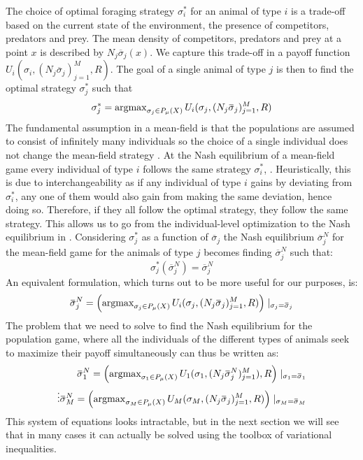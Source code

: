 The choice of optimal foraging strategy $\sigma_i^*$ for an animal of type $i$ is a trade-off based on the current state of the environment, the presence of competitors, predators and prey. The mean density of competitors, predators and prey at a point $x$ is described by $N_j \overbar{\sigma}_j(x)$. We capture this trade-off in a payoff function $U_i(\sigma_i, (N_j \overbar{\sigma}_j)_{j=1}^M, R)$. The goal of a single animal of type $j$ is then to find the optimal strategy $\sigma_j^*$ such that
\begin{equation}
  \label{eq:ind_opt}
  \sigma^*_j = \argmax_{\sigma_j \in P_{\mu}(X)} U_i(\sigma_j, (N_j \overbar{\sigma}_j)_{j=1}^M, R)
\end{equation}
The fundamental assumption in a mean-field is that the populations are assumed to consist of infinitely many individuals so the choice of a single individual does not change the mean-field strategy \citep{aumann1964markets}. At the Nash equilibrium of a mean-field game every individual of type $i$ follows the same strategy $\sigma_i^*$, \citep{lasry2007mean}. Heuristically, this is due to interchangeability as if any individual of type $i$ gains by deviating from $\sigma_i^*$, any one of them would also gain from making the same deviation, hence doing so. Therefore, if they all follow the optimal strategy, they follow the same strategy. This allows us to go from the individual-level optimization to the Nash equilibrium in . Considering $\sigma^*_{j}$ as a function of $\overbar{\sigma}_j$ the Nash equilibrium $\overbar{\sigma}_j^N$ for the mean-field game for the animals of type $j$ becomes finding $\overbar{\sigma}_j^N$ such that:
\begin{equation}
  \sigma^*_{j}(\overbar{\sigma}^N_j) = \overbar{\sigma}^N_j
\end{equation}
An equivalent formulation, which turns out to be more useful for our purposes, is:
\begin{equation}
  \label{eq:mfg_ne}
  \overbar{\sigma}_j^N = \pa{\argmax_{\sigma_j \in P_{\mu}(X)} U_i(\sigma_j, (N_j \overbar{\sigma}_j)_{j=1}^M, R) } \mid_{\sigma_j = \overbar{\sigma}_j}
\end{equation}
The problem that we need to solve to find the Nash equilibrium for the population game, where all the individuals of the different types of animals seek to maximize their payoff simultaneously can thus be written as:
\begin{equation}
  \label{eq:tot_nash_eq}
  \begin{split}
    \overbar{\sigma}_1^N = \pa{\argmax_{\sigma_1 \in P_{\mu}(X)} U_1(\sigma_1, (N_j \overbar{\sigma}^N_j)_{j=1}^M), R } \mid_{\sigma_1 = \overbar{\sigma}_1} \\
    \vdots
    \overbar{\sigma}_M^N = \pa{\argmax_{\sigma_M \in P_{\mu}(X)} U_M(\sigma_M, (N_j \overbar{\sigma}_j)_{j=1}^M, R) } \mid_{\sigma_M = \overbar{\sigma}_M}
    \end{split}
\end{equation}
This system of equations looks intractable, but in the next section we will see that in many cases it can actually be solved using the toolbox of variational inequalities.

